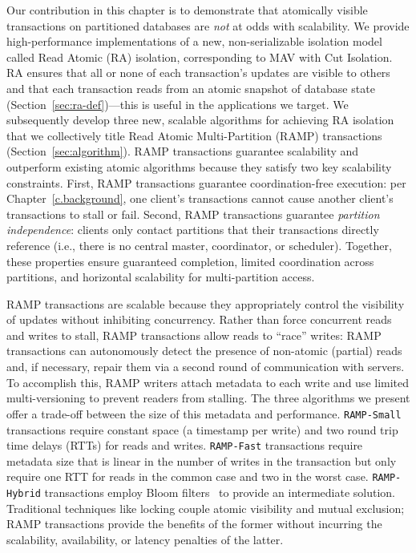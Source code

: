 Our contribution in this chapter is to demonstrate that atomically
visible transactions on partitioned databases are \textit{not} at odds
with scalability. We provide high-performance implementations of a
new, non-serializable isolation model called Read Atomic (RA)
isolation, corresponding to MAV with Cut Isolation. RA ensures that
all or none of each transaction's updates are visible to others and
that each transaction reads from an atomic snapshot of database state
(Section~\ref{sec:ra-def})---this is useful in the applications we
target. We subsequently develop three new, scalable algorithms for
achieving RA isolation that we collectively title Read Atomic
Multi-Partition (RAMP) transactions
(Section~\ref{sec:algorithm}). RAMP transactions guarantee scalability
and outperform existing atomic algorithms because they satisfy two key
scalability constraints. First, RAMP transactions guarantee
coordination-free execution: per Chapter~\ref{c.background}, one
client's transactions cannot cause another client's transactions to
stall or fail. Second, RAMP transactions guarantee \textit{partition
  independence}: clients only contact partitions that their
transactions directly reference (i.e., there is no central master,
coordinator, or scheduler). Together, these properties ensure
guaranteed completion, limited coordination across partitions, and
horizontal scalability for multi-partition access.

RAMP transactions are scalable because they appropriately control the
visibility of updates without inhibiting concurrency. Rather than
force concurrent reads and writes to stall, RAMP transactions allow
reads to ``race'' writes: RAMP transactions can autonomously detect
the presence of non-atomic (partial) reads and, if necessary, repair
them via a second round of communication with servers. To accomplish
this, RAMP writers attach metadata to each write and use limited
multi-versioning to prevent readers from stalling. The three
algorithms we present offer a trade-off between the size of this
metadata and performance. \texttt{RAMP-Small} transactions require
constant space (a timestamp per write) and two round trip time delays
(RTTs) for reads and writes. \texttt{RAMP-Fast} transactions require
metadata size that is linear in the number of writes in the
transaction but only require one RTT for reads in the common case and
two in the worst case. \texttt{RAMP-Hybrid} transactions employ Bloom
filters~\cite{bloomfilter} to provide an intermediate
solution. Traditional techniques like locking couple atomic visibility
and mutual exclusion; RAMP transactions provide the benefits of the
former without incurring the scalability, availability, or latency
penalties of the latter.

